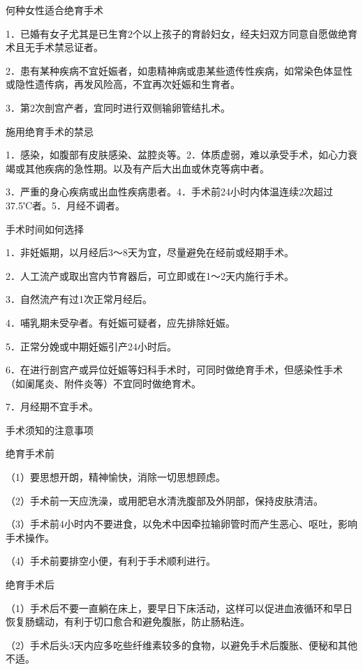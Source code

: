 \documentclass[12pt,UTF8]{ctexbook}
\begin{document}
何种女性适合绝育手术


1．已婚有女子尤其是已生育2个以上孩子的育龄妇女，经夫妇双方同意自愿做绝育术且无手术禁忌证者。

2．患有某种疾病不宜妊娠者，如患精神病或患某些遗传性疾病，如常染色体显性或隐性遗传病，再发风险高，不宜再次妊娠和生育者。

3．第2次剖宫产者，宜同时进行双侧输卵管结扎术。





施用绝育手术的禁忌


1．感染，如腹部有皮肤感染、盆腔炎等。2．体质虚弱，难以承受手术，如心力衰竭或其他疾病的急性期。以及有产后大出血或休克等病中者。

3．严重的身心疾病或出血性疾病患者。4．手术前24小时内体温连续2次超过37.5℃者。5．月经不调者。





手术时间如何选择


1．非妊娠期，以月经后3～8天为宜，尽量避免在经前或经期手术。

2．人工流产或取出宫内节育器后，可立即或在1～2天内施行手术。

3．自然流产有过1次正常月经后。

4．哺乳期未受孕者。有妊娠可疑者，应先排除妊娠。

5．正常分娩或中期妊娠引产24小时后。

6．在进行剖宫产或异位妊娠等妇科手术时，可同时做绝育手术，但感染性手术（如阑尾炎、附件炎等）不宜同时做绝育术。

7．月经期不宜手术。





手术须知的注意事项


绝育手术前

（1）要思想开朗，精神愉快，消除一切思想顾虑。

（2）手术前一天应洗澡，或用肥皂水清洗腹部及外阴部，保持皮肤清洁。

（3）手术前4小时内不要进食，以免术中因牵拉输卵管时而产生恶心、呕吐，影响手术操作。

（4）手术前要排空小便，有利于手术顺利进行。

绝育手术后

（1）手术后不要一直躺在床上，要早日下床活动，这样可以促进血液循环和早日恢复肠蠕动，有利于切口愈合和避免腹胀，防止肠粘连。

（2）手术后头3天内应多吃些纤维素较多的食物，以避免手术后腹胀、便秘和其他不适。
\end{document}
